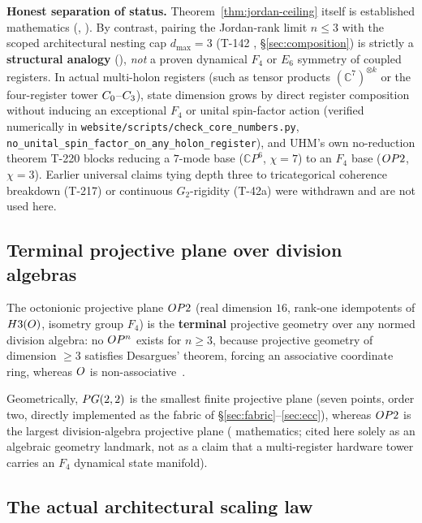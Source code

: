 \noindent\textbf{Honest separation of status.} Theorem~\ref{thm:jordan-ceiling}
itself is established mathematics (, \cite{jordan1934,baez2002}).
By contrast, pairing the Jordan-rank limit $n\le 3$ with the scoped
architectural nesting cap $d_{\max}=3$ (T-142 , \S\ref{sec:composition})
is strictly a \textbf{structural analogy} (), \emph{not} a proven
dynamical $F_4$ or $E_6$ symmetry of coupled \DM{} registers. In actual
multi-holon registers (such as tensor products $(\mathbb{C}^7)^{\otimes k}$ or
the four-register tower $C_0$--$C_3$), state dimension grows by direct
register composition without inducing an exceptional $F_4$ or unital spin-factor
action (verified numerically in \texttt{website/scripts/check\_core\_numbers.py},
\texttt{no\_unital\_spin\_factor\_on\_any\_holon\_register}), and UHM's own
no-reduction theorem T-220 blocks reducing a $7$-mode base ($\mathbb{C}P^6$,
$\chi=7$) to an $F_4$ base ($OP2$, $\chi=3$). Earlier universal claims tying
depth three to tricategorical coherence breakdown (T-217) or continuous
$G_2$-rigidity (T-42a) were withdrawn and are not used here.

\subsection{Terminal projective plane over division algebras}
\label{subsec:terminal}

\begin{theorem}
\label{thm:terminal}
The octonionic projective plane $OP2$ (real dimension $16$, rank-one
idempotents of $H3(O)$, isometry group $F_4$) is the \textbf{terminal}
projective geometry over any normed division algebra: no $O P^n$ exists for
$n\geq 3$, because projective geometry of dimension $\geq 3$ satisfies
Desargues' theorem, forcing an associative coordinate ring, whereas $O$ is
non-associative~\cite{baez2002}.
\end{theorem}

\noindent Geometrically, $PG(2,2)$ is the smallest finite projective plane
(seven points, order two, directly implemented as the \TALOS{} fabric of
\S\ref{sec:fabric}--\ref{sec:ecc}), whereas $OP2$ is the largest
division-algebra projective plane ( mathematics; cited here solely as
an algebraic geometry landmark, not as a claim that a multi-register hardware
tower carries an $F_4$ dynamical state manifold).

\subsection{The actual architectural scaling law}
\label{subsec:scaling-law}

